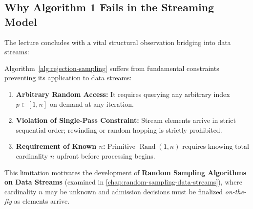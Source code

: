 \subsection{Why Algorithm 1 Fails in the Streaming Model}
The lecture concludes with a vital structural observation bridging into data streams:

\begin{property}
Algorithm~\ref{alg:rejection-sampling} suffers from fundamental constraints preventing its application to data streams:
\begin{enumerate}
  \item \textbf{Arbitrary Random Access:} It requires querying any arbitrary index $p \in [1, n]$ on demand at any iteration.
  \item \textbf{Violation of Single-Pass Constraint:} Stream elements arrive in strict sequential order; rewinding or random hopping is strictly prohibited.
  \item \textbf{Requirement of Known $n$:} Primitive $\operatorname{Rand}(1, n)$ requires knowing total cardinality $n$ upfront before processing begins.
\end{enumerate}
\end{property}

This limitation motivates the development of \textbf{Random Sampling Algorithms on Data Streams} (examined in \autoref{chap:random-sampling-data-streams}), where cardinality $n$ may be unknown and admission decisions must be finalized \emph{on-the-fly} as elements arrive.
